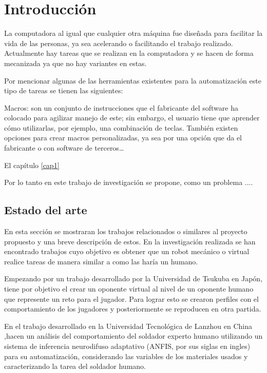 \chapter{Introducción \label{cap1}}

La computadora al igual que cualquier otra máquina fue diseñada para facilitar
la vida de las personas, ya sea acelerando o facilitando el trabajo realizado.
Actualmente hay tareas que se realizan en la computadora y se hacen de forma
mecanizada ya que no hay variantes en estas. 

Por mencionar algunas de las herramientas existentes  para la automatización
este tipo de tareas se tienen las siguientes:

Macros: son un conjunto de instrucciones que el fabricante del software ha
colocado para agilizar manejo de este; sin embargo, el usuario tiene  que
aprender cómo utilizarlas, por ejemplo, una combinación de teclas. También
existen opciones para crear macros personalizadas, ya sea por una opción que
da el fabricante o con software de terceros…

El capítulo \ref{cap1} 

Por lo tanto en este trabajo de investigación se propone, como un problema ....

\section{Estado del arte}
En esta sección se mostraran los trabajos relacionados o similares al proyecto
 propuesto y una breve descripción de estos. En la investigación realizada se 
 han encontrado trabajos cuyo objetivo es obtener que un robot mecánico o
 virtual realice tareas de manera similar a como las haría un humano. 

Empezando por un trabajo desarrollado por la Universidad de Tsukuba en
 Japón\cite{Nakano2006}, tiene por objetivo el crear un oponente virtual
 al nivel de un oponente humano que represente un reto para el jugador. Para
 lograr esto se crearon perfiles con el comportamiento de los jugadores y
 posteriormente se reproducen en otra partida.

En el trabajo desarrollado en la Universidad Tecnológica de Lanzhou en China
 \cite{Zhang2017},hacen un análisis del comportamiento del soldador experto
 humano utilizando un sistema de inferencia neurodifuso adaptativo (ANFIS,
 por sus siglas en ingles) para su automatización, considerando las variables
 de los materiales usados y caracterizando la tarea del soldador humano. 

